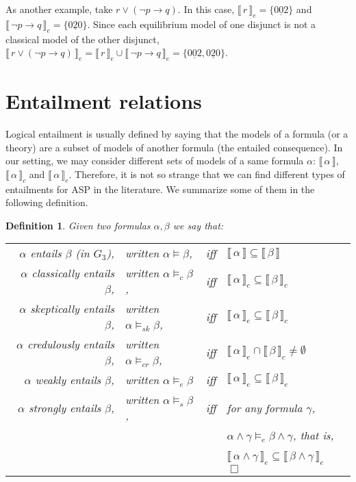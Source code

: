 \documentclass{tlp}
\newcommand{\den}[1]{\llbracket \, #1 \, \rrbracket}
\def\qed{~\hfill$\Box$}
\newtheorem{definition}{Definition}
\newcommand{\str}[1]{\underline{#1}}
\begin{document}
As another example, take $r \vee (\neg p \rightarrow q)$. In this case, $\den{r}_e=\{\str{002}\}$ and $\den{\neg p \rightarrow q}_e=\{\str{020}\}$. Since each equilibrium model of one disjunct is not a classical model of the other disjunct, $\den{r \vee (\neg p \rightarrow q)}_e=\den{r}_e \cup \den{\neg p \rightarrow q}_e = \{\str{002},\str{020}\}$.



\section{Entailment relations}\label{sec:entail}

Logical entailment is usually defined by saying that the models of a formula (or a theory) are a subset of models of another formula (the entailed consequence). In our setting, we may consider different sets of models of a same formula $\alpha$: $\den\alpha$, $\den{\alpha}_c$ and $\den{\alpha}_e$. Therefore, it is not so strange that we can find different types of entailments for ASP in the literature. We summarize some of them in the following definition.

\begin{definition}
Given two formulas $\alpha, \beta$ we say that:

\begin{tabular}{rlcl}
$\alpha$ \emph{entails} $\beta$ (in $G_3$), & written $\alpha \models \beta$, & iff & $\den{\alpha} \subseteq \den{\beta}$\\
$\alpha$ \emph{classically entails} $\beta$, & written $\alpha \models_c \beta$, & iff & $\den{\alpha}_c \subseteq \den{\beta}_c$\\
$\alpha$ \emph{skeptically entails} $\beta$, & written $\alpha \models_{sk} \beta$, & iff & $\den{\alpha}_e \subseteq \den{\beta}_c$\\
$\alpha$ \emph{credulously entails} $\beta$, & written $\alpha \models_{cr} \beta$, & iff & $\den{\alpha}_e \cap \den{\beta}_c \neq \emptyset$\\
$\alpha$ \emph{weakly entails} $\beta$, & written $\alpha \models_{e} \beta$ & iff & $\den{\alpha}_{e} \subseteq \den{\beta}_{e}$\\
$\alpha$ \emph{strongly entails} $\beta$, & written $\alpha \models_{s} \beta$, & iff & for any formula $\gamma$, \\
& & & $\alpha \wedge \gamma \models_{e} \beta \wedge \gamma$, that is,\\
& & & $\den{\alpha \wedge \gamma}_e \subseteq \den{\beta \wedge \gamma}_e$ \qed
\end{tabular}

\end{definition}
\end{document}
